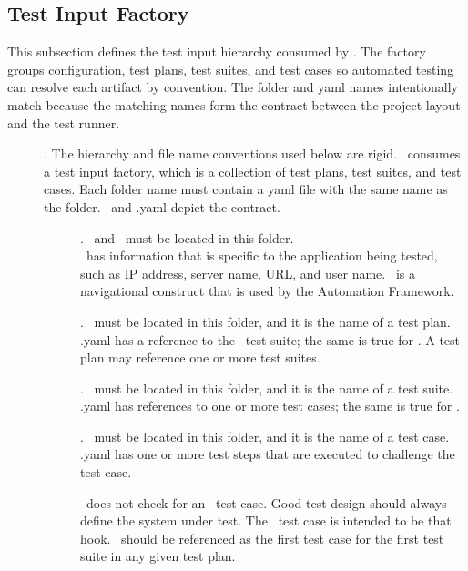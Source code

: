 \clearpage
\subsection{Test Input Factory}


\tlcVspace%

This subsection defines the test input hierarchy consumed by \amber. The
factory groups configuration, test plans, test suites, and test cases so
automated \gls{testing} can resolve each artifact by convention. The folder and
yaml names intentionally match because the matching names form the contract
between the project layout and the test runner.

\tlcVspace%

\begin{description}
  \item[\tfFactory] \required. The hierarchy and file name conventions used
    below are rigid. \amber\ consumes a test input factory, which is
    a collection of test plans, test suites, and test cases. Each folder name
    must contain a yaml file with the same name as the folder. \taName\
    and \taName.yaml depict the contract.

  \begin{description}
   \item[\tfConfig] \required. \caName\ and \cbName\ must be located in this
     folder. \\ \caName\ has information that is specific to the application
     being tested, such as IP address, server name, URL, and user name.
     \cbName\ is a navigational construct that is used by the Automation
     Framework.

   \item[\tfPlan] \required. \raName\ must be located in this folder, and it is
     the name of a test plan. \raName.yaml has a reference to the \raName\ test
     suite; the same is true for \rbName. A test plan may reference one or more
     test suites.

   \item[\tfSuite] \required. \raName\ must be located in this folder, and it is
     the name of a test suite. \raName.yaml has references to one or more test
     cases; the same is true for \rbName.

   \item[\tfCase] \required. \taName\ must be located in this folder, and it is
     the name of a test case. \taName.yaml has one or more test steps that are
     executed to challenge the test case.

   \item[\taName] \amber\ does not check for an \taName\ test case. Good test
     design should always define the system under test. The \taName\ test case
     is intended to be that hook. \taName\ should be referenced as the first
     test case for the first test suite in any given test plan.

  \end{description}
\end{description}

